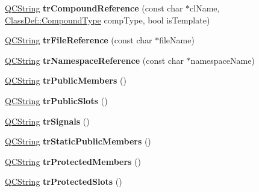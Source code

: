 \begin{DoxyCompactItemize}
\mbox{\hyperlink{class_q_c_string}{Q\+C\+String}} {\bfseries tr\+Compound\+Reference} (const char $\ast$cl\+Name, \mbox{\hyperlink{class_class_def_ae70cf86d35fe954a94c566fbcfc87939}{Class\+Def\+::\+Compound\+Type}} comp\+Type, bool is\+Template)
\item 
\mbox{\label{class_translator_dutch_ad61b212ecf3582fed9518b8bd47656ee}} 
\mbox{\hyperlink{class_q_c_string}{Q\+C\+String}} {\bfseries tr\+File\+Reference} (const char $\ast$file\+Name)
\item 
\mbox{\label{class_translator_dutch_aa4ff7e31b373c9ec582e601346bdf0a3}} 
\mbox{\hyperlink{class_q_c_string}{Q\+C\+String}} {\bfseries tr\+Namespace\+Reference} (const char $\ast$namespace\+Name)
\item 
\mbox{\label{class_translator_dutch_a303054815ed1813005d949136d84b8b6}} 
\mbox{\hyperlink{class_q_c_string}{Q\+C\+String}} {\bfseries tr\+Public\+Members} ()
\item 
\mbox{\label{class_translator_dutch_ac609e5abc3148bbab1157f79ea0e0215}} 
\mbox{\hyperlink{class_q_c_string}{Q\+C\+String}} {\bfseries tr\+Public\+Slots} ()
\item 
\mbox{\label{class_translator_dutch_a63f0a1e1b851405826290feaca6ff8c7}} 
\mbox{\hyperlink{class_q_c_string}{Q\+C\+String}} {\bfseries tr\+Signals} ()
\item 
\mbox{\label{class_translator_dutch_a4802dd0d65e8d8df78cc0a09f85190d9}} 
\mbox{\hyperlink{class_q_c_string}{Q\+C\+String}} {\bfseries tr\+Static\+Public\+Members} ()
\item 
\mbox{\label{class_translator_dutch_a924b8f5b7e84e0b40a7a8d4744aefc5d}} 
\mbox{\hyperlink{class_q_c_string}{Q\+C\+String}} {\bfseries tr\+Protected\+Members} ()
\item 
\mbox{\label{class_translator_dutch_a4aa5ef7994cacfbc0df4caf30ef3cf6a}} 
\mbox{\hyperlink{class_q_c_string}{Q\+C\+String}} {\bfseries tr\+Protected\+Slots} ()
\item 
\mbox{\label{class_translator_dutch_af1cf5f04f7e0c477ed23bfae810ea7ba}} 

\end{DoxyCompactItemize}
